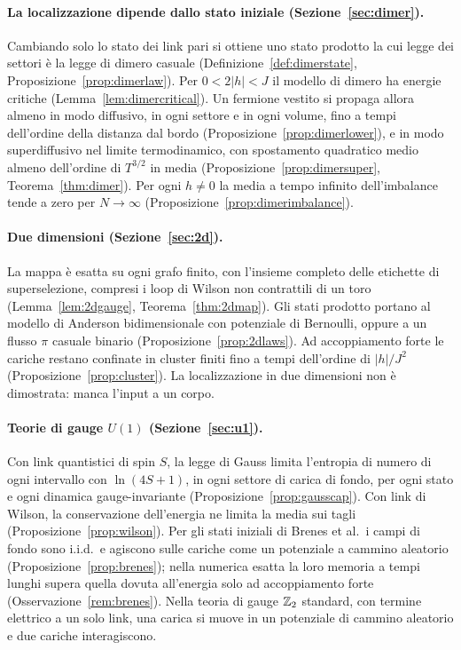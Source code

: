 \documentclass[11pt]{article}
\theoremstyle{stmtplain}
\theoremstyle{stmtdef}
\begin{document}
\paragraph{La localizzazione dipende dallo stato iniziale (Sezione~\ref{sec:dimer}).}
Cambiando solo lo stato dei link pari si ottiene uno stato prodotto la cui legge dei settori è la legge di dimero
casuale (Definizione~\ref{def:dimerstate}, Proposizione~\ref{prop:dimerlaw}). Per $0<2|h|<J$ il modello di dimero
ha energie critiche (Lemma~\ref{lem:dimercritical}). Un fermione vestito si propaga allora almeno in modo
diffusivo, in ogni settore e in ogni volume, fino a tempi dell'ordine della distanza dal bordo
(Proposizione~\ref{prop:dimerlower}), e in modo superdiffusivo nel limite termodinamico, con spostamento quadratico
medio almeno dell'ordine di $T^{3/2}$ in media (Proposizione~\ref{prop:dimersuper}, Teorema~\ref{thm:dimer}). Per
ogni $h\neq0$ la media a tempo infinito dell'imbalance tende a zero per $N\to\infty$
(Proposizione~\ref{prop:dimerimbalance}).

\paragraph{Due dimensioni (Sezione~\ref{sec:2d}).}
La mappa è esatta su ogni grafo finito, con l'insieme completo delle etichette di superselezione, compresi i loop di
Wilson non contrattili di un toro (Lemma~\ref{lem:2dgauge}, Teorema~\ref{thm:2dmap}). Gli stati prodotto portano al
modello di Anderson bidimensionale con potenziale di Bernoulli, oppure a un flusso $\pi$ casuale binario
(Proposizione~\ref{prop:2dlaws}). Ad accoppiamento forte le cariche restano confinate in cluster finiti fino a tempi
dell'ordine di $|h|/J^2$ (Proposizione~\ref{prop:cluster}). La localizzazione in due dimensioni non è dimostrata:
manca l'input a un corpo.

\paragraph{Teorie di gauge $U(1)$ (Sezione~\ref{sec:u1}).}
Con link quantistici di spin $S$, la legge di Gauss limita l'entropia di numero di ogni intervallo con
$\ln(4S+1)$, in ogni settore di carica di fondo, per ogni stato e ogni dinamica gauge-invariante
(Proposizione~\ref{prop:gausscap}). Con link di Wilson, la conservazione dell'energia ne limita la media sui tagli
(Proposizione~\ref{prop:wilson}). Per gli stati iniziali di Brenes et al.\ i campi di fondo sono i.i.d.\ e agiscono
sulle cariche come un potenziale a cammino aleatorio (Proposizione~\ref{prop:brenes}); nella numerica esatta la loro
memoria a tempi lunghi supera quella dovuta all'energia solo ad accoppiamento forte (Osservazione~\ref{rem:brenes}).
Nella teoria di gauge $\mathbb{Z}_2$ standard, con termine elettrico a un solo link, una
carica si muove in un potenziale di cammino aleatorio e due cariche interagiscono.
\end{document}
